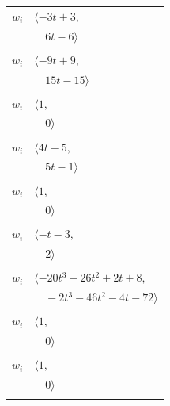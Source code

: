 \documentclass[11pt]{article}
\begin{document}
\begin{longtable}{@{}ll@{}}
$w_i$ & $\langle -3t+3,$\\
 & $\quad 6t-6\rangle$\\
\addlinespace[2pt]
\multicolumn{2}{@{}p{0.97\textwidth}@{}}{$i=42$, $D_i=1$, $\rho_{ij}$: $33{:}1, \allowbreak 93{:}1, \allowbreak 97{:}2$}\\
$w_i$ & $\langle -9t+9,$\\
 & $\quad 15t-15\rangle$\\
\addlinespace[2pt]
\multicolumn{2}{@{}p{0.97\textwidth}@{}}{$i=43$, $D_i=1$, $\rho_{ij}$: $--$}\\
$w_i$ & $\langle 1,$\\
 & $\quad 0\rangle$\\
\addlinespace[2pt]
\multicolumn{2}{@{}p{0.97\textwidth}@{}}{$i=44$, $D_i=1$, $\rho_{ij}$: $12{:}2, \allowbreak 24{:}1$}\\
$w_i$ & $\langle 4t-5,$\\
 & $\quad 5t-1\rangle$\\
\addlinespace[2pt]
\multicolumn{2}{@{}p{0.97\textwidth}@{}}{$i=45$, $D_i=1$, $\rho_{ij}$: $--$}\\
$w_i$ & $\langle 1,$\\
 & $\quad 0\rangle$\\
\addlinespace[2pt]
\multicolumn{2}{@{}p{0.97\textwidth}@{}}{$i=46$, $D_i=1$, $\rho_{ij}$: $23{:}2, \allowbreak 50{:}1$}\\
$w_i$ & $\langle -t-3,$\\
 & $\quad 2\rangle$\\
\addlinespace[2pt]
\multicolumn{2}{@{}p{0.97\textwidth}@{}}{$i=47$, $D_i=1$, $\rho_{ij}$: $1{:}1, \allowbreak 4{:}1, \allowbreak 5{:}2, \allowbreak 9{:}2, \allowbreak 19{:}2, \allowbreak 26{:}2, \allowbreak 39{:}2, \allowbreak 60{:}1, \allowbreak 61{:}1, \allowbreak 64{:}2$}\\
$w_i$ & $\langle -20t^{3}-26t^{2}+2t+8,$\\
 & $\quad -2t^{3}-46t^{2}-4t-72\rangle$\\
\addlinespace[2pt]
\multicolumn{2}{@{}p{0.97\textwidth}@{}}{$i=48$, $D_i=1$, $\rho_{ij}$: $--$}\\
$w_i$ & $\langle 1,$\\
 & $\quad 0\rangle$\\
\addlinespace[2pt]
\multicolumn{2}{@{}p{0.97\textwidth}@{}}{$i=49$, $D_i=1$, $\rho_{ij}$: $--$}\\
$w_i$ & $\langle 1,$\\
 & $\quad 0\rangle$\\
\addlinespace[2pt]
\multicolumn{2}{@{}p{0.97\textwidth}@{}}{$i=50$, $D_i=1$, $\rho_{ij}$: $4{:}2, \allowbreak 17{:}1, \allowbreak 46{:}2, \allowbreak 51{:}2, \allowbreak 56{:}1, \allowbreak 59{:}2, \allowbreak 64{:}1, \allowbreak 76{:}2, \allowbreak 82{:}2, \allowbreak 96{:}1$}\\

\end{longtable}
\end{document}
